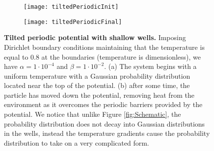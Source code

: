 \begin{figure}
	\begin{subfigure}{0.49\textwidth}
		\texttt{[image: tiltedPeriodicInit]}
	\end{subfigure}
	\begin{subfigure}{0.49\textwidth}
		\texttt{[image: tiltedPeriodicFinal]}
	\end{subfigure}
	\caption{\textbf{Tilted periodic potential with shallow wells.} Imposing Dirichlet boundary conditions maintaining that the temperature is equal to 0.8 at the boundaries (temperature is dimensionless), we have $\alpha = 1 \cdot 10^{-4}$ and $\beta = 1 \cdot 10^{-2}$. (a) The system begins with a uniform temperature with a Gaussian probability distribution located near the top of the potential. (b) after some time, the particle has moved down the potential, removing heat from the environment as it overcomes the periodic barriers provided by the potential. We notice that unlike Figure \ref{fig:Schematic}, the probability distribution does not decay into Gaussian distributions in the wells, instead the temperature gradients cause the probability distribution to take on a very complicated form. \label{fig:tiltedPeriodic}}
\end{figure}

